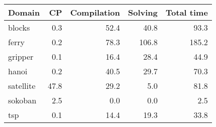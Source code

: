 \begin{tabular}{l|rrr|r}
	\toprule
	Domain & CP & Compilation & Solving & Total time \\ 
	\midrule 
	blocks & 0.3 & 52.4 & 40.8 & 93.3 \\ 
	ferry & 0.2 & 78.3 & 106.8 & 185.2 \\ 
	gripper & 0.1 & 16.4 & 28.4 & 44.9 \\ 
	hanoi & 0.2 & 40.5 & 29.7 & 70.3 \\ 
	satellite & 47.8 & 29.2 & 5.0 & 81.8 \\ 
	sokoban & 2.5 & 0.0 & 0.0 & 2.5 \\ 
	tsp & 0.1 & 14.4 & 19.3 & 33.8 \\ 
	\bottomrule
\end{tabular}